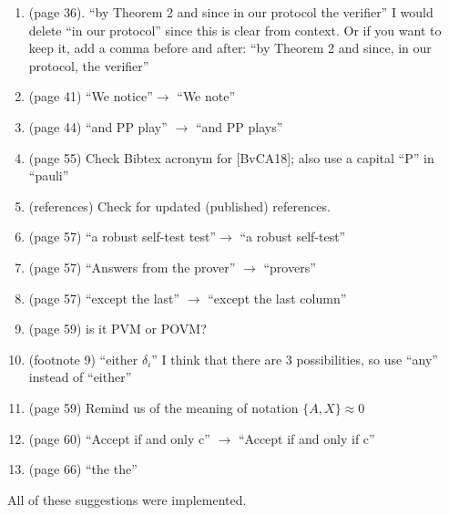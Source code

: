 \documentclass[12pt]{article}
\begin{document}
{\begin{enumerate}
\item (page 36). ``by Theorem 2 and since in
our protocol the verifier'' I would delete ``in our protocol'' since this is clear from context. Or if you want to keep it, add a comma before and after: ``by Theorem 2 and since, in
our protocol, the verifier''
\item (page 41) ``We notice''$\rightarrow$ ``We note''
\item (page 44) ``and PP play'' $\rightarrow$ ``and PP plays''
\item (page 55) Check Bibtex acronym for [BvCA18]; also use a capital ``P'' in ``pauli''
\item (references) Check for updated (published) references.
\item (page 57) ``a robust self-test test''$\rightarrow$ ``a robust self-test''
\item (page 57) ``Answers from the prover'' $\rightarrow$ ``provers''
\item (page 57) ``except the last'' $\rightarrow$ ``except the last column''
\item (page 59) is it PVM or POVM?
\item (footnote 9) ``either $\delta_i$'' I think that there are 3 possibilities, so use ``any'' instead of ``either''
\item (page 59) Remind us of the meaning of notation $\{A,X\} \approx 0$
\item (page 60) ``Accept if and only c'' $\rightarrow$ ``Accept if and only if c''
\item (page 66) ``the the''
\end{enumerate}}
{All of these suggestions were implemented.}
\end{document}
